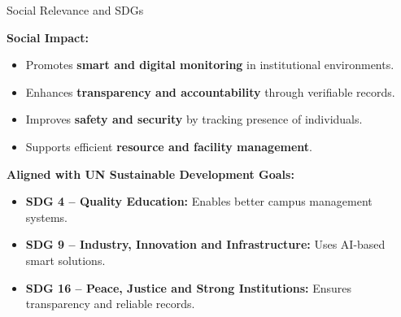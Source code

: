 \documentclass[10pt]{beamer}
\begin{document}
\begin{frame}{Social Relevance and SDGs}

\textbf{Social Impact:}
\begin{itemize}
    \item Promotes \textbf{smart and digital monitoring} in institutional environments.
    
    \item Enhances \textbf{transparency and accountability} through verifiable records.
    
    \item Improves \textbf{safety and security} by tracking presence of individuals.
    
    \item Supports efficient \textbf{resource and facility management}.
\end{itemize}

\vspace{0.3cm}

\textbf{Aligned with UN Sustainable Development Goals:}
\begin{itemize}
    \item \textbf{SDG 4 – Quality Education:} Enables better campus management systems.
    
    \item \textbf{SDG 9 – Industry, Innovation and Infrastructure:} Uses AI-based smart solutions.
    
    \item \textbf{SDG 16 – Peace, Justice and Strong Institutions:} Ensures transparency and reliable records.
\end{itemize}

\end{frame}
\end{document}
